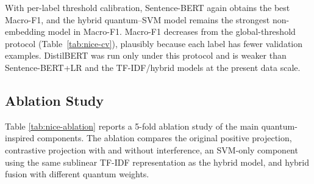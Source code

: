 \documentclass[runningheads]{llncs}
\begin{document}
\begin{table}[htbp]
\centering
\small
\caption{Mean and standard deviation of 5-fold NICE results with per-label
threshold calibration. This is the only protocol run for fine-tuned
DistilBERT; ``Q--SVM'' abbreviates hybrid quantum--SVM.}
\label{tab:nice-per-label}
\setlength{\tabcolsep}{4pt}
\end{table}

With per-label threshold calibration, Sentence-BERT again obtains the best
Macro-F1, and the hybrid quantum--SVM model remains the strongest
non-embedding model in Macro-F1. Macro-F1 decreases from the global-threshold
protocol (Table~\ref{tab:nice-cv}), plausibly because each label has fewer
validation examples. DistilBERT was run only under this protocol and is weaker
than Sentence-BERT+LR and the TF-IDF/hybrid models at the present data scale.

\subsection{Ablation Study}
Table \ref{tab:nice-ablation} reports a 5-fold ablation study of the main
quantum-inspired components. The ablation compares the original positive
projection, contrastive projection with and without interference, an SVM-only
component using the same sublinear TF-IDF representation as the hybrid model,
and hybrid fusion with different quantum weights.
\end{document}
